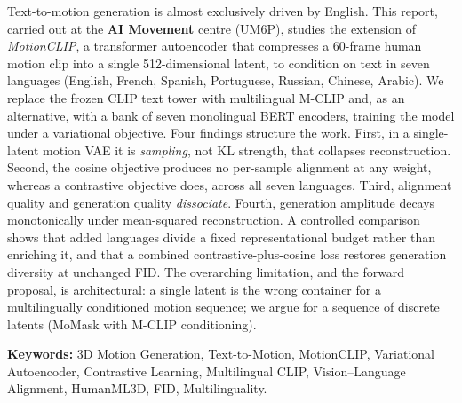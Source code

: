 \documentclass[12pt,a4paper,oneside]{report}
\theoremstyle{definition}
\theoremstyle{plain}
\begin{document}
Text-to-motion generation is almost exclusively driven by English. This report,
carried out at the \textbf{AI Movement} centre (UM6P), studies the extension of
\emph{MotionCLIP}, a transformer autoencoder that compresses a 60-frame human
motion clip into a single 512-dimensional latent, to condition on text in
seven languages (English, French, Spanish, Portuguese, Russian, Chinese,
Arabic). We replace the frozen CLIP text tower with multilingual M-CLIP and, as
an alternative, with a bank of seven monolingual BERT encoders, training the
model under a variational objective. Four findings structure the work. First,
in a single-latent motion VAE it is \emph{sampling}, not KL strength, that
collapses reconstruction. Second, the cosine objective produces no per-sample
alignment at any weight, whereas a contrastive objective does, across all seven
languages. Third, alignment quality and generation quality \emph{dissociate}.
Fourth, generation amplitude decays monotonically under mean-squared
reconstruction. A controlled comparison shows that added languages divide a
fixed representational budget rather than enriching it, and that a combined
contrastive-plus-cosine loss restores generation diversity at unchanged FID. The
overarching limitation, and the forward proposal, is architectural: a single
latent is the wrong container for a multilingually conditioned motion sequence;
we argue for a sequence of discrete latents (MoMask with M-CLIP conditioning).

\vspace{0.6cm}
\noindent\textbf{Keywords:} 3D Motion Generation, Text-to-Motion, MotionCLIP,
Variational Autoencoder, Contrastive Learning, Multilingual CLIP, Vision--Language
Alignment, HumanML3D, FID, Multilinguality.

\end{document}
